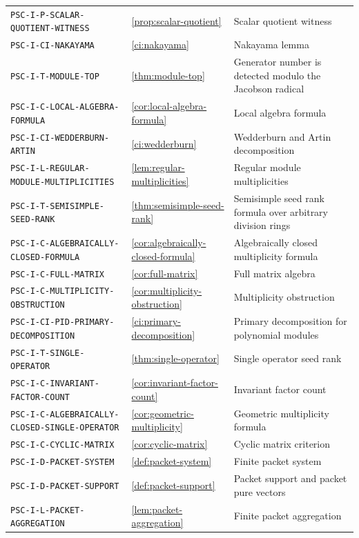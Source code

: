 \begin{longtable}{@{}p{}p{}p{}@{}}
\nolinkurl{PSC-I-P-SCALAR-QUOTIENT-WITNESS} & \ref{prop:scalar-quotient} & Scalar quotient witness \\
\nolinkurl{PSC-I-CI-NAKAYAMA} & \ref{ci:nakayama} & Nakayama lemma \\
\nolinkurl{PSC-I-T-MODULE-TOP} & \ref{thm:module-top} & Generator number is detected modulo the Jacobson radical \\
\nolinkurl{PSC-I-C-LOCAL-ALGEBRA-FORMULA} & \ref{cor:local-algebra-formula} & Local algebra formula \\
\nolinkurl{PSC-I-CI-WEDDERBURN-ARTIN} & \ref{ci:wedderburn} & Wedderburn and Artin decomposition \\
\nolinkurl{PSC-I-L-REGULAR-MODULE-MULTIPLICITIES} & \ref{lem:regular-multiplicities} & Regular module multiplicities \\
\nolinkurl{PSC-I-T-SEMISIMPLE-SEED-RANK} & \ref{thm:semisimple-seed-rank} & Semisimple seed rank formula over arbitrary division rings \\
\nolinkurl{PSC-I-C-ALGEBRAICALLY-CLOSED-FORMULA} & \ref{cor:algebraically-closed-formula} & Algebraically closed multiplicity formula \\
\nolinkurl{PSC-I-C-FULL-MATRIX} & \ref{cor:full-matrix} & Full matrix algebra \\
\nolinkurl{PSC-I-C-MULTIPLICITY-OBSTRUCTION} & \ref{cor:multiplicity-obstruction} & Multiplicity obstruction \\
\nolinkurl{PSC-I-CI-PID-PRIMARY-DECOMPOSITION} & \ref{ci:primary-decomposition} & Primary decomposition for polynomial modules \\
\nolinkurl{PSC-I-T-SINGLE-OPERATOR} & \ref{thm:single-operator} & Single operator seed rank \\
\nolinkurl{PSC-I-C-INVARIANT-FACTOR-COUNT} & \ref{cor:invariant-factor-count} & Invariant factor count \\
\nolinkurl{PSC-I-C-ALGEBRAICALLY-CLOSED-SINGLE-OPERATOR} & \ref{cor:geometric-multiplicity} & Geometric multiplicity formula \\
\nolinkurl{PSC-I-C-CYCLIC-MATRIX} & \ref{cor:cyclic-matrix} & Cyclic matrix criterion \\
\nolinkurl{PSC-I-D-PACKET-SYSTEM} & \ref{def:packet-system} & Finite packet system \\
\nolinkurl{PSC-I-D-PACKET-SUPPORT} & \ref{def:packet-support} & Packet support and packet pure vectors \\
\nolinkurl{PSC-I-L-PACKET-AGGREGATION} & \ref{lem:packet-aggregation} & Finite packet aggregation \\

\end{longtable}
